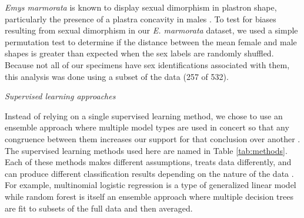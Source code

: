 \documentclass[12pt,letterpaper]{article}
\renewcommand{\subsection}[1]{%
\bigskip
\begin{center}
\begin{large}
\normalfont\itshape #1
\end{large}
\end{center}}
\begin{document}
\textit{Emys marmorata} is known to display sexual dimorphism in plastron shape, particularly the presence of a plastra concavity in males \citep{Seeliger1945}. To test for biases resulting from sexual dimorphism in our \textit{E. marmorata} dataset, we used a simple permutation test to determine if the distance between the mean female and male shapes is greater than expected when the sex labels are randomly shuffled. Because not all of our specimens have sex identifications associated with them, this analysis was done using a subset of the data (257 of 532).


\subsection{Supervised learning approaches}
Instead of relying on a single supervised learning method, we chose to use an ensemble approach where multiple model types are used in concert so that any congruence between them increases our support for that conclusion over another \citep{Hastie2009}. The supervised learning methods used here are named in Table \ref{tab:methods}. Each of these methods makes different assumptions, treats data differently, and can produce different classification results depending on the nature of the data \citep{Hastie2009}. For example, multinomial logistic regression is a type of generalized linear model while random forest is itself an ensemble approach where multiple decision trees are fit to subsets of the full data and then averaged.

\begin{table}
  \centering
  \caption{Table of the supervised learning methods used in this analysis.}
  \label{tab:methods}
\end{table}
\end{document}
